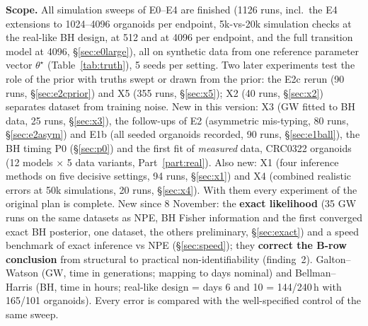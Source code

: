 \documentclass[10pt,a4paper]{article}
\begin{document}
\textbf{Scope.} All simulation sweeps of E0--E4 are finished (1126 runs, incl.\ the E4 extensions to 1024--4096 organoids per endpoint, 5k-vs-20k simulation checks at the real-like BH design, at 512 and at 4096 per endpoint, and the full transition model at 4096, \S\ref{sec:e0large}), all on synthetic data from one reference parameter vector $\theta^\star$ (Table~\ref{tab:truth}), 5 seeds per setting. Two later experiments test the role of the prior with truths swept or drawn from the prior: the E2c rerun (90 runs, \S\ref{sec:e2cprior}) and X5 (355 runs, \S\ref{sec:x5}); X2 (40 runs, \S\ref{sec:x2}) separates dataset from training noise. New in this version: X3 (GW fitted to BH data, 25 runs, \S\ref{sec:x3}), the follow-ups of E2 (asymmetric mis-typing, 80 runs, \S\ref{sec:e2asym}) and E1b (all seeded organoids recorded, 90 runs, \S\ref{sec:e1ball}), the BH timing P0 (\S\ref{sec:p0}) and the first fit of \emph{measured} data, CRC0322 organoids (12 models $\times$ 5 data variants, Part~\ref{part:real}). Also new: X1 (four inference methods on five decisive settings, 94 runs, \S\ref{sec:x1}) and X4 (combined realistic errors at 50k simulations, 20 runs, \S\ref{sec:x4}). With them every experiment of the original plan is complete. New since 8 November: the \textbf{exact likelihood} (35 GW runs on the same datasets as NPE, BH Fisher information and the first converged exact BH posterior, one dataset, the others preliminary, \S\ref{sec:exact}) and a speed benchmark of exact inference vs NPE (\S\ref{sec:speed}); they \textbf{correct the B-row conclusion} from structural to practical non-identifiability (finding~2). Galton--Watson (GW, time in generations; mapping to days nominal) and Bellman--Harris (BH, time in hours; real-like design = days 6 and 10 = 144/240\,h with 165/101 organoids). Every error is compared with the well-specified control of the same sweep.
\end{document}
